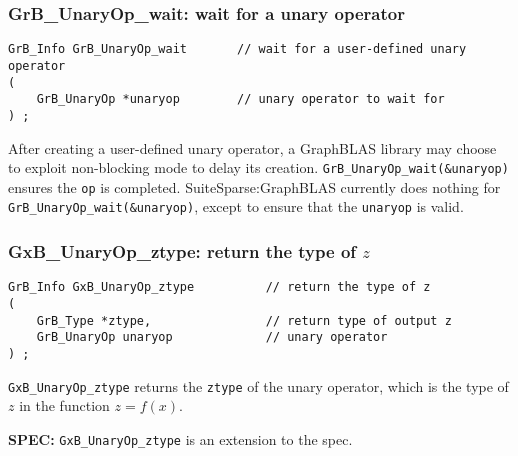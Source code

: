 \documentclass[12pt]{article}
\begin{document}

\subsubsection{{\sf GrB\_UnaryOp\_wait:} wait for a unary operator}

\begin{mdframed}[userdefinedwidth=6in]
{\footnotesize
\begin{verbatim}
GrB_Info GrB_UnaryOp_wait       // wait for a user-defined unary operator
(
    GrB_UnaryOp *unaryop        // unary operator to wait for
) ;
\end{verbatim}
}\end{mdframed}

After creating a user-defined unary operator, a GraphBLAS library may choose to
exploit non-blocking mode to delay its creation.
\verb'GrB_UnaryOp_wait(&unaryop)' ensures the \verb'op' is completed.
SuiteSparse:GraphBLAS currently does nothing for
\verb'GrB_UnaryOp_wait(&unaryop)', except to ensure that the \verb'unaryop' is
valid.

\subsubsection{{\sf GxB\_UnaryOp\_ztype:} return the type of $z$}
\label{unaryop_ztype}

\begin{mdframed}[userdefinedwidth=6in]
{\footnotesize
\begin{verbatim}
GrB_Info GxB_UnaryOp_ztype          // return the type of z
(
    GrB_Type *ztype,                // return type of output z
    GrB_UnaryOp unaryop             // unary operator
) ;
\end{verbatim}
}\end{mdframed}

\verb'GxB_UnaryOp_ztype' returns the \verb'ztype' of the unary operator, which
is the type of $z$ in the function $z=f(x)$.

\begin{spec}
{\bf SPEC:} \verb'GxB_UnaryOp_ztype' is an extension to the spec.
\end{spec}
\end{document}
